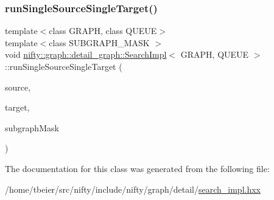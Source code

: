 \mbox{\label{classnifty_1_1graph_1_1detail__graph_1_1SearchImpl_ab662caa4f11668c78c516554dc6a97a1}} 
\subsubsection{\texorpdfstring{run\+Single\+Source\+Single\+Target()}{runSingleSourceSingleTarget()}\hspace{0.1cm}{\footnotesize\ttfamily [2/2]}}
{\footnotesize\ttfamily template$<$class G\+R\+A\+PH, class Q\+U\+E\+UE$>$ \\
template$<$class S\+U\+B\+G\+R\+A\+P\+H\+\_\+\+M\+A\+SK $>$ \\
void \hyperlink{classnifty_1_1graph_1_1detail__graph_1_1SearchImpl}{nifty\+::graph\+::detail\+\_\+graph\+::\+Search\+Impl}$<$ G\+R\+A\+PH, Q\+U\+E\+UE $>$\+::run\+Single\+Source\+Single\+Target (\begin{DoxyParamCaption}\item[{const int64\+\_\+t}]{source,  }\item[{const int64\+\_\+t}]{target,  }\item[{const S\+U\+B\+G\+R\+A\+P\+H\+\_\+\+M\+A\+SK \&}]{subgraph\+Mask }\end{DoxyParamCaption})\hspace{0.3cm}{\ttfamily [inline]}}



The documentation for this class was generated from the following file\+:\begin{DoxyCompactItemize}
\item 
/home/tbeier/src/nifty/include/nifty/graph/detail/\hyperlink{search__impl_8hxx}{search\+\_\+impl.\+hxx}\end{DoxyCompactItemize}
